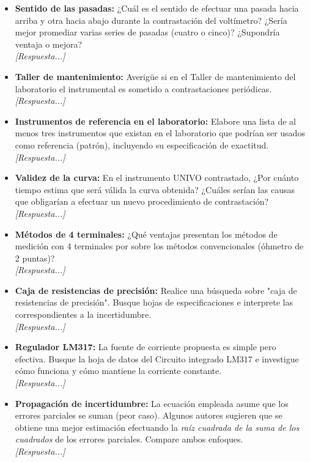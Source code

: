 \documentclass{informeutn}
\begin{document}
\begin{itemize}
    \item \textbf{Sentido de las pasadas:} ¿Cuál es el sentido de efectuar una pasada hacia arriba y otra hacia abajo durante la contrastación del voltímetro? ¿Sería mejor promediar varias series de pasadas (cuatro o cinco)? ¿Supondría ventaja o mejora?
    \\ \textit{[Respuesta...]}

    \item \textbf{Taller de mantenimiento:} Averigüe si en el Taller de mantenimiento del laboratorio el instrumental es sometido a contrastaciones periódicas.
    \\ \textit{[Respuesta...]}

    \item \textbf{Instrumentos de referencia en el laboratorio:} Elabore una lista de al menos tres instrumentos que existan en el laboratorio que podrían ser usados como referencia (patrón), incluyendo su especificación de exactitud.
    \\ \textit{[Respuesta...]}

    \item \textbf{Validez de la curva:} En el instrumento UNIVO contrastado, ¿Por cuánto tiempo estima que será válida la curva obtenida? ¿Cuáles serían las causas que obligarían a efectuar un nuevo procedimiento de contrastación?
    \\ \textit{[Respuesta...]}

    \item \textbf{Métodos de 4 terminales:} ¿Qué ventajas presentan los métodos de medición con 4 terminales por sobre los métodos convencionales (óhmetro de 2 puntas)?
    \\ \textit{[Respuesta...]}

    \item \textbf{Caja de resistencias de precisión:} Realice una búsqueda sobre "caja de resistencias de precisión". Busque hojas de especificaciones e interprete las correspondientes a la incertidumbre.
    \\ \textit{[Respuesta...]}

    \item \textbf{Regulador LM317:} La fuente de corriente propuesta es simple pero efectiva. Busque la hoja de datos del Circuito integrado LM317 e investigue cómo funciona y cómo mantiene la corriente constante.
    \\ \textit{[Respuesta...]}

    \item \textbf{Propagación de incertidumbre:} La ecuación empleada asume que los errores parciales se suman (peor caso). Algunos autores sugieren que se obtiene una mejor estimación efectuando la \textit{raíz cuadrada de la suma de los cuadrados} de los errores parciales. Compare ambos enfoques.
    \\ \textit{[Respuesta...]}
\end{itemize}
\end{document}

